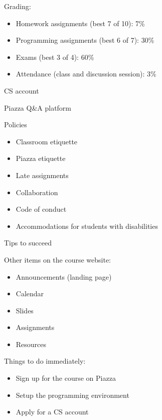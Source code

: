 \documentclass[8pt,a4paper,compress]{beamer}
\begin{document}
\begin{frame}[fragile]
Grading:
\begin{itemize}
\item Homework assignments (best 7 of 10): 7\%
\item Programming assignments (best 6 of 7): 30\%
\item Exams (best 3 of 4): 60\%
\item Attendance (class and discussion session): 3\%
\end{itemize}

\bigskip

CS account

\bigskip

Piazza Q\&A platform

\bigskip

Policies
\begin{itemize}
\item Classroom etiquette
\item Piazza etiquette
\item Late assignments
\item Collaboration
\item Code of conduct
\item Accommodations for students with disabilities
\end{itemize}
\end{frame}

\begin{frame}[fragile]
Tips to succeed

\bigskip

Other items on the course website:
\begin{itemize}
\item Announcements (landing page)
\item Calendar
\item Slides 
\item Assignments
\item Resources
\end{itemize}

\bigskip

Things to do immediately:
\begin{itemize}
\item Sign up for the course on Piazza
\item Setup the programming environment
\item Apply for a CS account
\end{itemize}
\end{frame}
\end{document}
